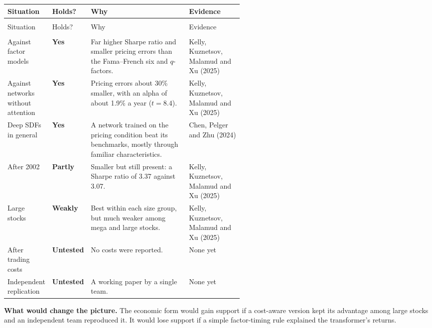 {\small
\begin{longtable}{@{}>{\raggedright\arraybackslash}p{0.19\linewidth}>{\raggedright\arraybackslash}p{0.13\linewidth}>{\raggedright\arraybackslash}p{}>{\raggedright\arraybackslash}p{0.23\linewidth}@{}}
\toprule
Situation & Holds? & Why & Evidence \\
\midrule
\endfirsthead
\multicolumn{4}{@{}l}{\emph{(continued)}} \\
\toprule
Situation & Holds? & Why & Evidence \\
\midrule
\endhead
\midrule
\multicolumn{4}{r@{}}{\emph{(continued on the next page)}} \\
\endfoot
\bottomrule
\endlastfoot
Against factor models & \textbf{Yes} & Far higher Sharpe ratio and smaller pricing errors than the Fama--French six and $q$-factors. & Kelly, Kuznetsov, Malamud and Xu (2025) \\*
\addlinespace[3pt]
Against networks without attention & \textbf{Yes} & Pricing errors about 30\% smaller, with an alpha of about 1.9\% a year ($t = 8.4$). & Kelly, Kuznetsov, Malamud and Xu (2025) \\
\addlinespace[3pt]
Deep SDFs in general & \textbf{Yes} & A network trained on the pricing condition beat its benchmarks, mostly through familiar characteristics. & Chen, Pelger and Zhu (2024) \\
\addlinespace[3pt]
After 2002 & \textbf{Partly} & Smaller but still present: a Sharpe ratio of 3.37 against 3.07. & Kelly, Kuznetsov, Malamud and Xu (2025) \\
\addlinespace[3pt]
Large stocks & \textbf{Weakly} & Best within each size group, but much weaker among mega and large stocks. & Kelly, Kuznetsov, Malamud and Xu (2025) \\
\addlinespace[3pt]
After trading costs & \textbf{Untested} & No costs were reported. & None yet \\*
\addlinespace[3pt]
Independent replication & \textbf{Untested} & A working paper by a single team. & None yet \\
\end{longtable}
\addtocounter{table}{-1}%
}

\textbf{What would change the picture.} The economic form would gain support if a cost-aware version kept its advantage among large stocks and an independent team reproduced it. It would lose support if a simple factor-timing rule explained the transformer's returns.

